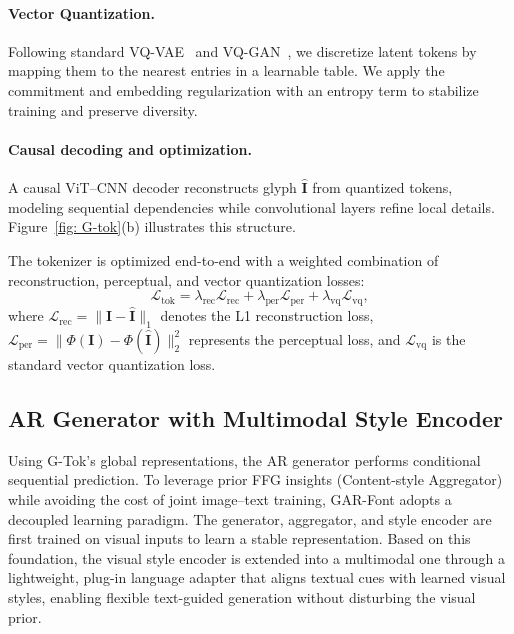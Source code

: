 \paragraph{Vector Quantization.} Following standard VQ-VAE~\cite{VQ_VAE} and VQ-GAN~\cite{VQ_GAN}, we discretize latent tokens by mapping them to the nearest entries in a learnable table. We apply the commitment and embedding regularization with an entropy term to stabilize training and preserve diversity.
\vspace{-4mm}
\paragraph{Causal decoding and optimization.} A causal ViT–CNN decoder reconstructs glyph $\hat{\mathbf{I}}$ from quantized tokens, modeling sequential dependencies while convolutional layers refine local details. Figure~\ref{fig: G-tok}(b) illustrates this structure.

The tokenizer is optimized end-to-end with a weighted combination of reconstruction, perceptual, and vector quantization losses:
\begin{equation}
    \mathcal{L}_{\text{tok}} =
\lambda_{\text{rec}}\mathcal{L}_{\text{rec}} +
\lambda_{\text{per}}\mathcal{L}_{\text{per}} +
\lambda_{\text{vq}}\mathcal{L}_{\text{vq}},
\end{equation}
where $\mathcal{L}_{\text{rec}}=\|\mathbf{I}-\hat{\mathbf{I}}\|_1$ denotes the L1 reconstruction loss, $\mathcal{L}_{\text{per}}=\|\Phi(\mathbf{I})-\Phi(\hat{\mathbf{I}})\|_2^2$ represents the perceptual loss, and $\mathcal{L}_{\text{vq}}$ is the standard vector quantization loss. 

\subsection{AR Generator with Multimodal Style Encoder}
Using G-Tok’s global representations, the AR generator performs conditional sequential prediction. To leverage prior FFG insights (Content-style Aggregator) while avoiding the cost of joint image–text training, GAR-Font adopts a decoupled learning paradigm. The generator, aggregator, and style encoder are first trained on visual inputs to learn a stable representation. Based on this foundation, the visual style encoder is extended into a multimodal one through a lightweight, plug-in language adapter that aligns textual cues with learned visual styles, enabling flexible text-guided generation without disturbing the visual prior.

